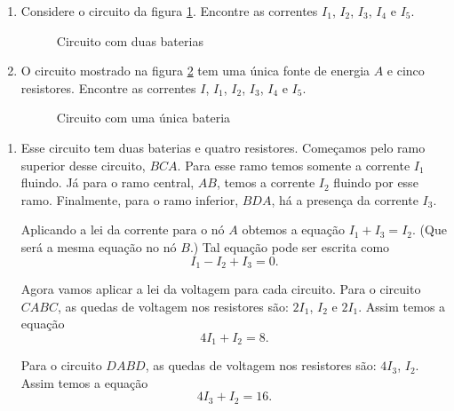 \begin{exemplos}
    \begin{enumerate}
        \item Considere o circuito da figura \ref{circuitoduasbaterias}. Encontre as correntes $I_1$, $I_2$, $I_3$, $I_4$ e $I_5$.

        \begin{figure}[!h]
            \centering
            
            \caption{Circuito com duas baterias}
            \label{circuitoduasbaterias}
        \end{figure}

        \item O circuito mostrado na figura \ref{circuitocomumaunicafonte} tem uma única fonte de energia $A$ e cinco resistores. Encontre as correntes $I$, $I_1$, $I_2$, $I_3$, $I_4$ e $I_5$.

        \begin{figure}[!h]
            \centering
            
            \caption{Circuito com uma única bateria}
            \label{circuitocomumaunicafonte}
        \end{figure}
    \end{enumerate}
    \begin{solucao}
        \begin{enumerate}
            \item Esse circuito tem duas baterias e quatro resistores. Começamos pelo ramo superior desse circuito, $BCA$. Para esse ramo temos somente a corrente $I_1$ fluindo.  Já para o ramo central, $AB$, temos a corrente $I_2$ fluindo por esse ramo. Finalmente, para o ramo inferior, $BDA$, há a presença da corrente $I_3$.

            Aplicando a lei da corrente para o nó $A$ obtemos a equação $I_1 + I_3 = I_2$. (Que será a mesma equação no nó $B$.) Tal equação pode ser escrita como
            \[
                I_1 - I_2 + I_3 = 0.
            \]

            Agora vamos aplicar a lei da voltagem para cada circuito. Para o circuito $CABC$, as quedas de voltagem nos resistores são: $2I_1$, $I_2$ e $2I_1$. Assim temos a equação
            \begin{equation}\label{equacaocircuitoCABC}
                4I_1 + I_2 = 8.
            \end{equation}

            Para o circuito $DABD$, as quedas de voltagem nos resistores são: $4I_3$, $I_2$. Assim temos a equação
            \begin{equation}\label{equacaocircuitoDABD}
                4I_3 + I_2 = 16.
            \end{equation}


\end{enumerate}
\end{solucao}
\end{exemplos}
